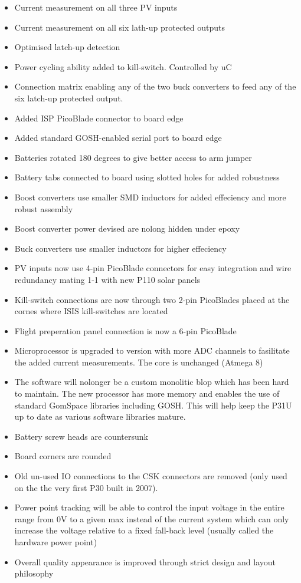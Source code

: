 \documentclass[9pt,a4paper]{article}
\begin{document}
\begin{itemize}
\item
  Current measurement on all three PV inputs
\item
  Current measurement on all six lath-up protected outputs
\item
  Optimised latch-up detection
\item
  Power cycling ability added to kill-switch. Controlled by uC
\item
  Connection matrix enabling any of the two buck converters to feed any
  of the six latch-up protected output.
\item
  Added ISP PicoBlade connector to board edge
\item
  Added standard GOSH-enabled serial port to board edge
\item
  Batteries rotated 180 degrees to give better access to arm jumper
\item
  Battery tabs connected to board using slotted holes for added
  robustness
\item
  Boost converters use smaller SMD inductors for added effeciency and
  more robust assembly
\item
  Boost converter power devised are nolong hidden under epoxy
\item
  Buck converters use smaller inductors for higher effeciency
\item
  PV inputs now use 4-pin PicoBlade connectors for easy integration and
  wire redundancy mating 1-1 with new P110 solar panels
\item
  Kill-switch connections are now through two 2-pin PicoBlades placed at
  the cornes where ISIS kill-switches are located
\item
  Flight preperation panel connection is now a 6-pin PicoBlade
\item
  Microprocessor is upgraded to version with more ADC channels to
  fasilitate the added current measurements. The core is unchanged
  (Atmega 8)
\item
  The software will nolonger be a custom monolitic blop which has been
  hard to maintain. The new processor has more memory and enables the
  use of standard GomSpace libraries including GOSH. This will help keep
  the P31U up to date as various software libraries mature.
\item
  Battery screw heads are countersunk
\item
  Board corners are rounded
\item
  Old un-used IO connections to the CSK connectors are removed (only
  used on the the very first P30 built in 2007).
\item
  Power point tracking will be able to control the input voltage in the
  entire range from 0V to a given max instead of the current system
  which can only increase the voltage relative to a fixed fall-back
  level (usually called the hardware power point)
\item
  Overall quality appearance is improved through strict design and
  layout philosophy
\end{itemize}
\end{document}
